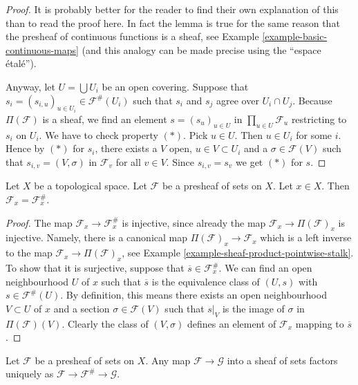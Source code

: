\begin{proof}
It is probably better for the reader to find their own explanation
of this than to read the proof here. In fact the lemma is true
for the same reason that the presheaf of continuous
functions is a sheaf, see Example \ref{example-basic-continuous-maps}
(and this analogy can be made precise using the ``espace \'etal\'e'').

\medskip\noindent
Anyway, let $U = \bigcup U_i$ be an open covering.
Suppose that $s_i = (s_{i, u})_{u \in U_i} \in \mathcal{F}^{\#}(U_i)$
such that $s_i$ and $s_j$ agree over $U_i \cap U_j$.
Because $\Pi(\mathcal{F})$ is a sheaf,
we find an element $s = (s_u)_{u\in U}$ in $\prod_{u\in U} \mathcal{F}_u$
restricting to $s_i$ on $U_i$. We have to check property $(*)$.
Pick $u \in U$. Then $u \in U_i$ for some $i$. Hence by $(*)$ for $s_i$,
there exists a $V$ open, $u \in V \subset U_i$
and a $\sigma \in \mathcal{F}(V)$
such that $s_{i, v} = (V, \sigma)$ in $\mathcal{F}_v$
for all $v \in V$. Since $s_{i, v} = s_v$ we get $(*)$ for $s$.
\end{proof}

\begin{lemma}
\label{lemma-stalk-sheafification}
Let $X$ be a topological space.
Let $\mathcal{F}$ be a presheaf of sets on $X$.
Let $x \in X$. Then $\mathcal{F}_x = \mathcal{F}^\#_x$.
\end{lemma}

\begin{proof}
The map $\mathcal{F}_x \to \mathcal{F}^\#_x$
is injective, since already the map
$\mathcal{F}_x \to \Pi(\mathcal{F})_x$ is injective.
Namely, there is a canonical map $\Pi(\mathcal{F})_x \to \mathcal{F}_x$
which is a left inverse to the map $\mathcal{F}_x \to \Pi(\mathcal{F})_x$,
see Example \ref{example-sheaf-product-pointwise-stalk}.
To show that it is surjective, suppose that
$\overline{s} \in \mathcal{F}^\#_x$.
We can find an open neighbourhood $U$ of $x$ such that
$\overline{s}$ is the equivalence class of $(U, s)$
with $s \in \mathcal{F}^\#(U)$.
By definition, this means there exists an open neighbourhood
$V \subset U$ of $x$ and a section $\sigma \in \mathcal{F}(V)$
such that $s|_V$ is the image of $\sigma$ in $\Pi(\mathcal{F})(V)$.
Clearly the class of $(V, \sigma)$ defines an element of
$\mathcal{F}_x$ mapping to $\overline{s}$.
\end{proof}

\begin{lemma}
\label{lemma-sheafify-universal}
Let $\mathcal{F}$ be a presheaf of sets on $X$.
Any map $\mathcal{F} \to \mathcal{G}$ into a sheaf of sets
factors uniquely as
$\mathcal{F} \to \mathcal{F}^\# \to \mathcal{G}$.
\end{lemma}

